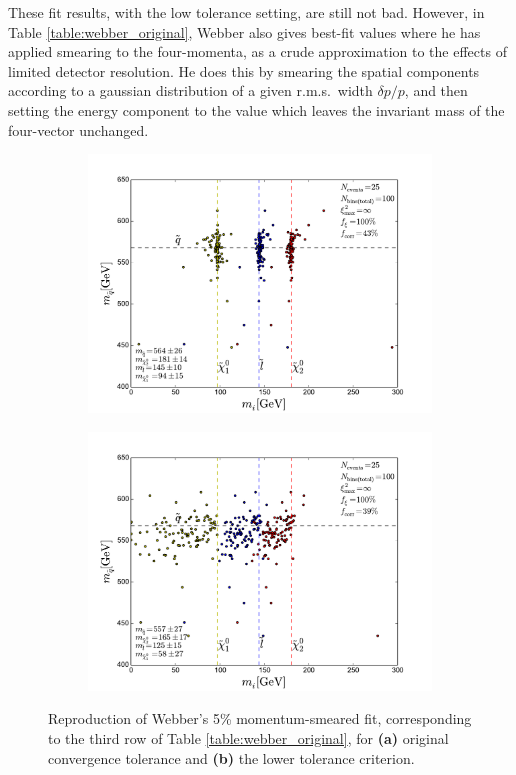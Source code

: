 \documentclass[twoside,english]{uiofysmaster}
\begin{document}
These fit results, with the low tolerance setting, are still not bad. However, in Table \ref{table:webber_original}, Webber also gives best-fit values where he has applied smearing to the four-momenta, as a crude approximation to the effects of limited detector resolution. He does this by smearing the spatial components according to a gaussian distribution of a given r.m.s.\ width $\delta p/p$, and then setting the energy component to the value which leaves the invariant mass of the four-vector unchanged.
\begin{figure}[hbtp!]
	\centering
	\begin{subfigure}[b]{0.8\textwidth}
		\includegraphics[width=\textwidth]{figures/webber_rec_table/webber_HW-rec_OFL_minuit-minimizer_hightol_5pmomsmear_nocut.pdf} 
		\caption{ }
	\end{subfigure}

	\begin{subfigure}[b]{0.8\textwidth}
		\includegraphics[width=\textwidth]{figures/webber_rec_table/webber_HW-rec_OFL_minuit-minimizer_lowtol_5pmomsmear_nocut.pdf}
		\caption{ } 
	\end{subfigure}
	\caption{Reproduction of Webber's 5\% momentum-smeared fit, corresponding to the third row of Table \ref{table:webber_original}, for {\bf (a)} original convergence tolerance and {\bf (b)} the lower tolerance criterion.}
	\label{fig:webber_rec_scatter_tolerance-comparison_5pmomsmear}
\end{figure} 
\end{document}
